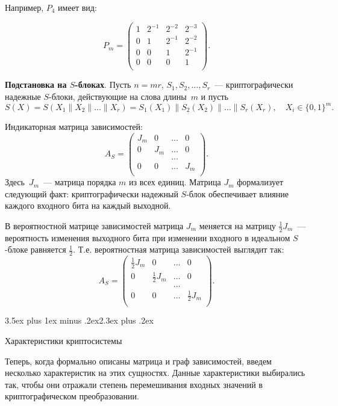 \documentclass[a4paper,12pt]{report}
\makeatletter
\theoremstyle{plain} %
\theoremstyle{definition}
\theoremstyle{remark}
\renewcommand{\section}{\@startsection{section}{1}{18pt}%
{3.5ex plus 1ex minus .2ex}{2.3ex plus .2ex}%
{\normalfont\Large\bfseries\raggedright}}%
\makeatother
\begin{document}
\begin{large}
Например, $P_4$ имеет вид:

$$
P_m = 
\begin{pmatrix} 
1 & 2^{-1} & 2^{-2} & 2^{-3}\\ 
0 & 1 & 2^{-1} & 2^{-2}\\ 
0 & 0 & 1 & 2^{-1}\\
0 & 0 & 0 & 1\\
\end{pmatrix}.
$$

{\bf Подстановка на $S$-блоках}.
Пусть $n=mr$, $S_1,S_2,\ldots,S_r$~---
криптографически надежные $S$-блоки,
действующие на слова длины~$m$ и 
пусть 
$$
S(X)=S(X_1\parallel X_2\parallel\ldots\parallel X_r)=
S_1(X_1)\parallel S_2(X_2)\parallel\ldots\parallel S_r(X_r),\quad
X_i\in\{0,1\}^m.
$$

Индикаторная матрица зависимостей:
$$
A_S = 
\begin{pmatrix} 
J_m & 0 & \ldots & 0\\ 
0 & J_m & \ldots & 0\\
  &     & \ldots &\\
0 &  0  & \ldots & J_m\\
\end{pmatrix}.
$$
Здесь~$J_m$~--- матрица порядка $m$ из всех единиц.
Матрица $J_m$ формализует следующий факт: 
криптографически надежный $S$-блок обеспечивает 
влияние каждого входного бита на каждый выходной.

В вероятностной матрице зависимостей матрица 
$J_m$ меняется на матрицу $\frac{1}{2}J_m$~---
вероятность изменения выходного бита при изменении 
входного в идеальном $S$-блоке равняется $\frac{1}{2}$. Т.е. вероятностная матрица зависимостей выглядит так:
$$
A_S = 
\begin{pmatrix} 
\frac{1}{2}J_m & 0 & \ldots & 0\\ 
0 &\frac{1}{2} J_m & \ldots & 0\\
  &     & \ldots &\\
0 &  0  & \ldots & \frac{1}{2}J_m\\
\end{pmatrix}.
$$

\section{Характеристики криптосистемы}

Теперь, когда формально описаны матрица и граф зависимостей, введем несколько характеристик на этих сущностях. Данные характеристики выбирались так, чтобы они отражали степень перемешивания входных значений в криптографическом преобразовании.


\end{large}
\end{document}
